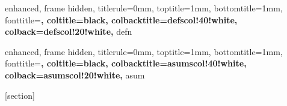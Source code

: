 {
    enhanced,
    frame hidden,
    titlerule=0mm,
    toptitle=1mm,
    bottomtitle=1mm,
    fonttitle=\sffamily\bfseries,
    coltitle=black,
    colbacktitle=defscol!40!white,
    colback=defscol!20!white,
}{defn}




{
    enhanced,
    frame hidden,
    titlerule=0mm,
    toptitle=1mm,
    bottomtitle=1mm,
    fonttitle=\sffamily\bfseries,
    coltitle=black,
    colbacktitle=asumscol!40!white,
    colback=asumscol!20!white,
}{asum}





[section]
\renewcommand{\themytheorem}{\Roman{chapter}.\thesection.\arabic{mytheorem}}


\makeatletter
\newenvironment{thmpf}{%
  \par\noindent{\it \textbfs{定理的证明。}}\par
  \tcolorbox[
    blanker,
    breakable,
    enhanced jigsaw,
    parbox=false,
    colback=white,
    left=5mm,
    before upper={\parindent15pt\relax\allowdisplaybreaks},
    after skip=10pt,
    borderline west={1mm}{0pt}{thmscol!20!white}
  ]%
}{%
  \textcolor{thmscol!18!white}{\hbox{}\nobreak\hfill$\blacksquare$}%
  \endtcolorbox
}
\makeatother



